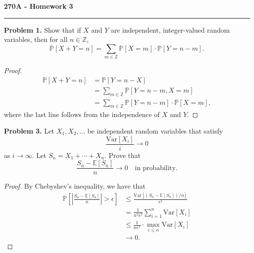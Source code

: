 \documentclass[11pt,letterpaper]{report}
\newcommand{\integers}{\mathbb{Z}}
\newcommand{\E}{\mathbb{E}}
\newcommand{\Prob}{\mathbb{P}}
\newcommand{\Var}{\text{Var}}
\begin{document}
\begin{center}
{\bf \Large 270A - Homework 3}
\vspace{0.2cm}
\hrule
\end{center}

\noindent\textbf{Problem 1. }Show that if $X$ and $Y$ are independent, integer-valued random variables, then for all $n\in \integers$,
\[
\Prob[X+Y=n] = \sum_{m\in \integers}\Prob[X=m]\cdot\Prob[Y=n-m].
\]
\begin{proof}
	\begin{align*}
		\Prob[X+Y=n] &= \Prob[Y = n-X]\\
		&= \sum_{m\in \integers}\Prob[Y = n-m, X=m]\\
		&= \sum_{m\in \integers}\Prob[Y=n-m]\cdot \Prob[X=m],
	\end{align*}
	where the last line follows from the independence of $X$ and $Y$.
\end{proof}

\noindent\textbf{Problem 3. }
Let $X_1, X_2, \ldots$ be independent random variables that satisfy
\[
\frac{\Var[X_i]}{i}\to 0
\]
as $i\to \infty$. Let $S_n = X_1 + \cdots + X_n$. Prove that
\[
\frac{S_n-\E[S_n]}{n}\to 0\quad\text{in probability}.
\]
\begin{proof}
	By Chebyshev's inequality, we have that
	\begin{align*}
		\Prob\left[\left|\frac{S_n- \E[S_n]}{n}\right|>\epsilon\right]&\leq \frac{\Var[(S_n - \E[S_n])/n]}{\epsilon^2}\\
		&= \frac{1}{n^2\epsilon^2}\sum_{i=1}^n\Var[X_i]\\
		&\leq \frac{1}{n\epsilon^2}\cdot \max_{i\leq n}\Var[X_i]\\
		&\to 0.
	\end{align*}
\end{proof}
\end{document}
